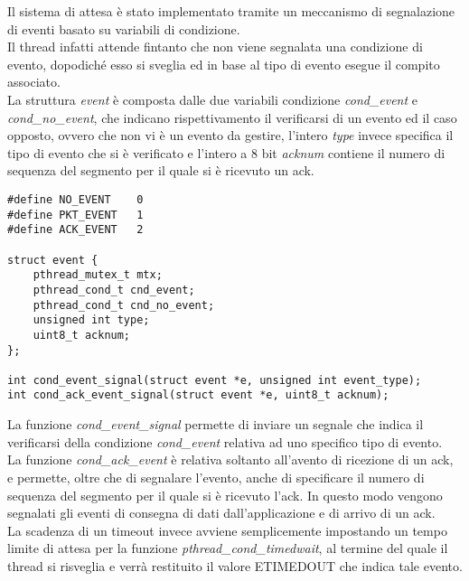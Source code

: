 Il sistema di attesa è stato implementato tramite un meccanismo di segnalazione
di eventi basato su variabili di condizione.\\
Il thread infatti attende fintanto che non viene segnalata una condizione di
evento, dopodiché esso si sveglia ed in base al tipo di evento 
esegue il compito associato.\\
La struttura \emph{event} è composta dalle due variabili condizione 
\emph{cond\_event} e \emph{cond\_no\_event}, che indicano rispettivamento
il verificarsi di un evento ed il caso opposto, ovvero che non vi è un evento
da gestire, l'intero \emph{type} invece specifica il tipo di evento che si è
verificato e l'intero a 8 bit \emph{acknum} contiene il numero di sequenza del
segmento per il quale si è ricevuto un ack.
%
\begin{lstlisting}[title=event.h]
#define NO_EVENT	0
#define PKT_EVENT	1
#define ACK_EVENT	2

struct event {
	pthread_mutex_t mtx;
	pthread_cond_t cnd_event;
	pthread_cond_t cnd_no_event;
	unsigned int type;
	uint8_t acknum;
};

int cond_event_signal(struct event *e, unsigned int event_type);
int cond_ack_event_signal(struct event *e, uint8_t acknum);
\end{lstlisting}
%
La funzione \emph{cond\_event\_signal} permette di inviare un segnale che indica il
verificarsi della condizione \emph{cond\_event} relativa ad uno specifico tipo di 
evento.\\
La funzione \emph{cond\_ack\_event} è relativa soltanto all'avento di ricezione
di un ack, e permette, oltre che di segnalare l'evento, anche di specificare
il numero di sequenza del segmento per il quale si è ricevuto l'ack.
In questo modo vengono segnalati gli eventi di consegna di dati dall'applicazione
e di arrivo di un ack.\\
La scadenza di un timeout invece avviene semplicemente 
impostando un tempo limite di attesa per la funzione \emph{pthread\_cond\_timedwait},
al termine del quale il thread si risveglia e verrà restituito il valore ETIMEDOUT 
che indica tale evento.
%
